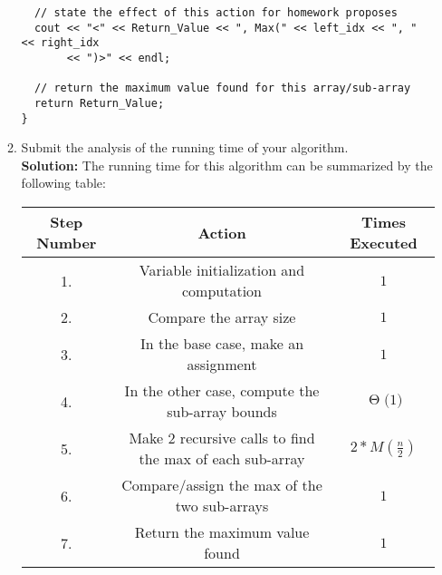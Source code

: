 \documentclass[11pts]{article}
\newcommand{\BigTheta}[1]{\ensuremath{\operatorname{\Theta}\bigl(#1\bigr)}}
\begin{document}
\begin{enumerate}
\begin{enumerate}
\begin{verbatim}
  // state the effect of this action for homework proposes
  cout << "<" << Return_Value << ", Max(" << left_idx << ", " << right_idx
       << ")>" << endl;

  // return the maximum value found for this array/sub-array
  return Return_Value;
}
    \end{verbatim}
\newpage

  \item Submit the analysis of the running time of your algorithm. \\

  \textbf{Solution:} The running time for this algorithm can be summarized by
  the following table: \\
    \begin{center}
    \begin{tabular}{| c || c | c |}
      \hline
      Step Number & Action & Times Executed  \\
      \hline \hline
      1.          & Variable initialization and computation & $1$ \\
      \hline
      2.          & Compare the array size & $1$ \\
      \hline
      3.          & In the base case, make an assignment & $1$ \\
      \hline
      4.          & In the other case, compute the sub-array
                    bounds                                   & \BigTheta{1} \\
      \hline
      5.          & Make 2 recursive calls to find the
                    max of each sub-array              & $2 * M(\frac{n}{2})$ \\
      \hline
      6.          & Compare/assign the max of the two
                    sub-arrays                         & $1$ \\
      \hline
      7.          & Return the maximum value found     & $1$ \\
      \hline
    \end{tabular}
    \end{center}


\end{enumerate}
\end{enumerate}
\end{document}
